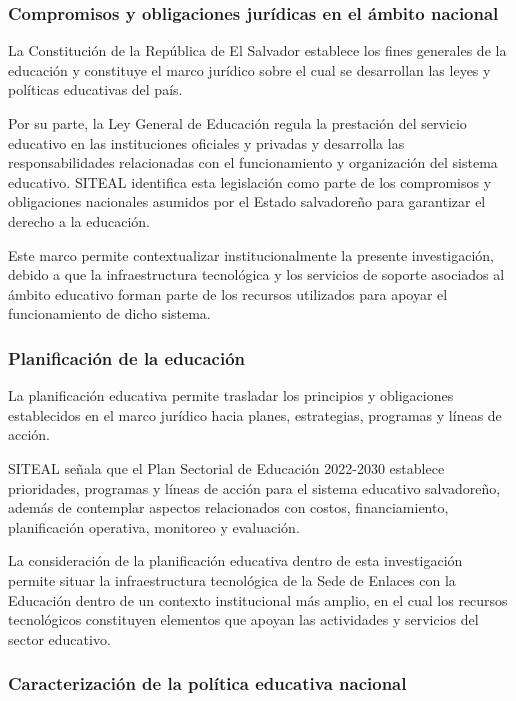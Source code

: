 \subsubsection{Compromisos y obligaciones jurídicas en el ámbito nacional}



La Constitución de la República de El Salvador establece los fines generales de la educación y constituye el marco jurídico sobre el cual se desarrollan las leyes y políticas educativas del país.

Por su parte, la Ley General de Educación regula la prestación del servicio educativo en las instituciones oficiales y privadas y desarrolla las responsabilidades relacionadas con el funcionamiento y organización del sistema educativo. SITEAL identifica esta legislación como parte de los compromisos y obligaciones nacionales asumidos por el Estado salvadoreño para garantizar el derecho a la educación.

Este marco permite contextualizar institucionalmente la presente investigación, debido a que la infraestructura tecnológica y los servicios de soporte asociados al ámbito educativo forman parte de los recursos utilizados para apoyar el funcionamiento de dicho sistema.

\subsubsection{Planificación de la educación}

La planificación educativa permite trasladar los principios y obligaciones establecidos en el marco jurídico hacia planes, estrategias, programas y líneas de acción.

SITEAL señala que el Plan Sectorial de Educación 2022-2030 establece prioridades, programas y líneas de acción para el sistema educativo salvadoreño, además de contemplar aspectos relacionados con costos, financiamiento, planificación operativa, monitoreo y evaluación.

La consideración de la planificación educativa dentro de esta investigación permite situar la infraestructura tecnológica de la Sede de Enlaces con la Educación dentro de un contexto institucional más amplio, en el cual los recursos tecnológicos constituyen elementos que apoyan las actividades y servicios del sector educativo.

\subsubsection{Caracterización de la política educativa nacional}

